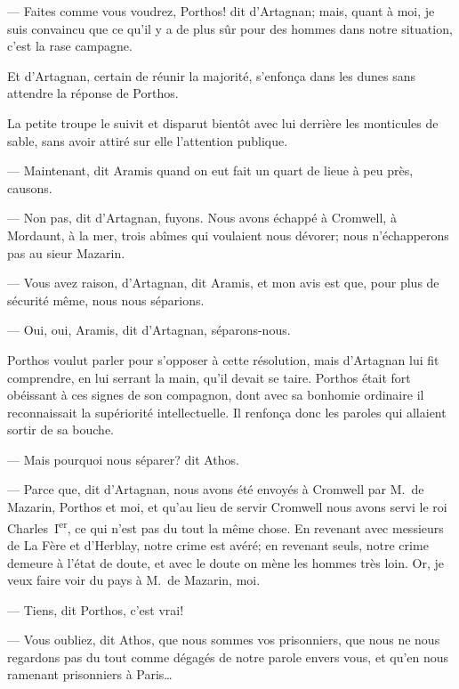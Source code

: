 — Faites comme vous voudrez, Porthos! dit d'Artagnan; mais, quant à moi, je suis convaincu que ce qu'il y a de plus sûr pour des hommes dans notre situation, c'est la rase campagne.

Et d'Artagnan, certain de réunir la majorité, s'enfonça dans les dunes sans attendre la réponse de Porthos.

La petite troupe le suivit et disparut bientôt avec lui derrière les monticules de sable, sans avoir attiré sur elle l'attention publique.

— Maintenant, dit Aramis quand on eut fait un quart de lieue à peu près, causons.

— Non pas, dit d'Artagnan, fuyons. Nous avons échappé à Cromwell, à Mordaunt, à la mer, trois abîmes qui voulaient nous dévorer; nous n'échapperons pas au sieur Mazarin.

— Vous avez raison, d'Artagnan, dit Aramis, et mon avis est que, pour plus de sécurité même, nous nous séparions.

— Oui, oui, Aramis, dit d'Artagnan, séparons-nous.

Porthos voulut parler pour s'opposer à cette résolution, mais d'Artagnan lui fit comprendre, en lui serrant la main, qu'il devait se taire. Porthos était fort obéissant à ces signes de son compagnon, dont avec sa bonhomie ordinaire il reconnaissait la supériorité intellectuelle. Il renfonça donc les paroles qui allaient sortir de sa bouche.

— Mais pourquoi nous séparer? dit Athos.

— Parce que, dit d'Artagnan, nous avons été envoyés à Cromwell par M.~de Mazarin, Porthos et moi, et qu'au lieu de servir Cromwell nous avons servi le roi Charles~I\textsuperscript{er}, ce qui n'est pas du tout la même chose. En revenant avec messieurs de La Fère et d'Herblay, notre crime est avéré; en revenant seuls, notre crime demeure à l'état de doute, et avec le doute on mène les hommes très loin. Or, je veux faire voir du pays à M.~de Mazarin, moi.

— Tiens, dit Porthos, c'est vrai!

— Vous oubliez, dit Athos, que nous sommes vos prisonniers, que nous ne nous regardons pas du tout comme dégagés de notre parole envers vous, et qu'en nous ramenant prisonniers à Paris\dots

